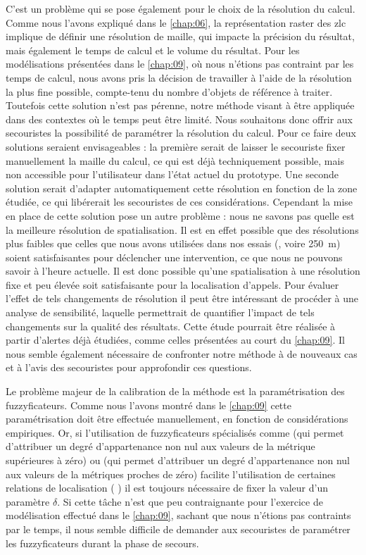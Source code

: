C'est un problème qui se pose également pour le choix de la résolution
du calcul. Comme nous l'avons expliqué dans le \autoref{chap:06}, la
représentation raster des \ac{zlc} implique de définir une résolution
de maille, qui impacte la précision du résultat, mais également le
temps de calcul et le volume du résultat. Pour les modélisations
présentées dans le \autoref{chap:09}, où nous n'étions pas contraint
par les temps de calcul, nous avons pris la décision de travailler à
l'aide de la résolution la plus fine possible, compte-tenu du nombre
d'objets de référence à traiter. Toutefois cette solution n'est pas
pérenne, notre méthode visant à être appliquée dans des contextes où
le temps peut être limité. Nous souhaitons donc offrir aux secouristes
la possibilité de paramétrer la résolution du calcul. Pour ce faire
deux solutions seraient envisageables : la première serait de laisser
le secouriste fixer manuellement la maille du calcul, ce qui est déjà
techniquement possible, mais non accessible pour l'utilisateur dans
l'état actuel du prototype. Une seconde solution serait d'adapter
automatiquement cette résolution en fonction de la zone étudiée, ce
qui libérerait les secouristes de ces considérations. Cependant la
mise en place de cette solution pose un autre problème : nous ne
savons pas quelle est la meilleure résolution de spatialisation. Il
est en effet possible que des résolutions plus faibles que celles que
nous avons utilisées dans nos essais (, voire 250~m) soient
satisfaisantes pour déclencher une intervention, ce que nous ne
pouvons savoir à l'heure actuelle. Il est donc possible qu'une
spatialisation à une résolution fixe et peu élevée soit satisfaisante
pour la localisation d'appels. Pour évaluer l'effet de tels
changements de résolution il peut être intéressant de procéder à une
analyse de sensibilité, laquelle permettrait de quantifier l'impact de
tels changements sur la qualité des résultats. Cette étude pourrait
être réalisée à partir d'alertes déjà étudiées, comme celles
présentées au court du \autoref{chap:09}. Il nous semble également
nécessaire de confronter notre méthode à de nouveaux cas et à l'avis
des secouristes pour approfondir ces questions.

Le problème majeur de la calibration de la méthode est la
paramétrisation des fuzzyficateurs. Comme nous l'avons montré dans le
\autoref{chap:09} cette paramétrisation doit être effectuée
manuellement, en fonction de considérations empiriques. Or, si
l'utilisation de fuzzyficateurs spécialisés comme
 (qui permet d'attribuer un degré
d'appartenance non nul aux valeurs de la métrique supérieures à zéro)
ou  (qui permet d'attribuer un degré
d’appartenance non nul aux valeurs de la métriques proches de zéro)
facilite l'utilisation de certaines relations de localisation (\eg
{}) il est toujours nécessaire de fixer la valeur
d'un paramètre \(\delta\). Si cette tâche n'est que peu contraignante
pour l'exercice de modélisation effectué dans le \autoref{chap:09},
sachant que nous n'étions pas contraints par le temps, il nous semble
difficile de demander aux secouristes de paramétrer les fuzzyficateurs
durant la phase de secours.

